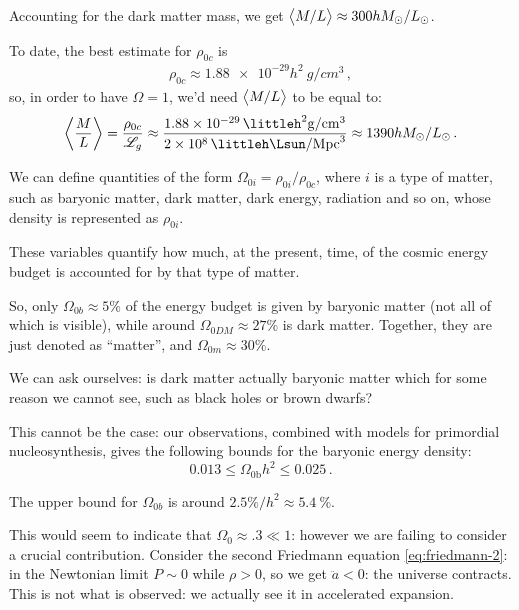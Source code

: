 \documentclass[main.tex]{subfiles}
\begin{document}
Accounting for the dark matter mass, we get \(\expval{M/L} \approx 300 h M_\odot / L_\odot\).

To date, the best estimate for \(\rho_{0c}\) is 
%
\begin{align}
\rho_{0c} \approx \num{1.88e-29} h^2 \SI{}{g /cm^3}
\,,
\end{align}
%
so, in order to have \(\Omega = 1\), we'd need \(\expval{M/L}\) to be equal to:
%
\begin{align}
\expval{\frac{M}{L}} 
= \frac{\rho_{0c}}{\mathscr{L}_{g}}
\approx \frac{\SI{1.88e-29}{\littleh^2 g /cm^{3}}}{\SI{2e8}{\littleh \Lsun /Mpc^{3}}}
\approx 1390 h M_{\odot} / L_{\odot}
\,.
\end{align}


We can define quantities of the form \(\Omega_{0i}  = \rho_{0i} / \rho_{0c}\), where \(i\) is a type of matter, such as baryonic matter, dark matter, dark energy, radiation and so on, whose density is represented as \(\rho_{0i}\).

These variables quantify how much, at the present, time, of the cosmic energy budget is accounted for by that type of matter.

So, only \(\Omega_{0b} \approx 5\%\) of the energy budget is given by baryonic matter (not all of which is visible), while around \(\Omega_{0 DM} \approx 27\%\) is dark matter.
Together, they are just denoted as ``matter'', and \(\Omega_{0m} \approx 30 \%\).

We can ask ourselves: is dark matter actually baryonic matter which for some reason we cannot see, such as black holes or brown dwarfs?

This cannot be the case: our observations, combined with models for primordial nucleosynthesis, gives the following bounds for the baryonic energy density: 
%
\begin{equation}
0.013 \leq \Omega_{\text{0b}} h^2 \leq 0.025
\,.
\end{equation}

The upper bound for \(\Omega_{0b}\) is around \(2.5\%/h^2 \approx \SI{5.4}{\percent}\).



This would seem to indicate that \(\Omega_{0} \approx \num{.3} \ll 1\): however we are failing to consider a crucial contribution.
Consider the second Friedmann equation \eqref{eq:friedmann-2}: in the Newtonian limit \(P \sim 0\) while \( \rho >0 \), so we get \(\ddot{a} <0\): the universe contracts.
This is not what is observed: we actually see it in accelerated expansion.
\end{document}
